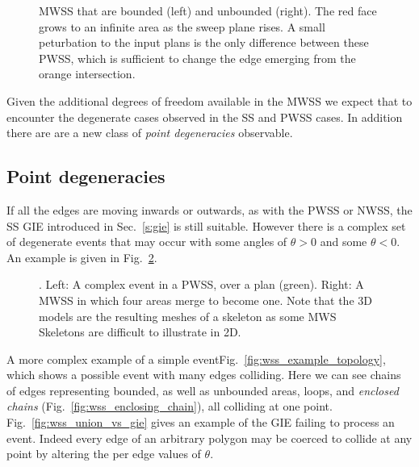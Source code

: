 \begin{figure}
  \centering
  \def\svgwidth{1.0\columnwidth}
  
  \caption[Unbounded MWSS]{\label{fig:wss_unbounded}MWSS that are bounded (left) and unbounded (right). The red face grows to an infinite area as the sweep plane rises. A small peturbation to the input plans is the only difference between these PWSS, which is sufficient to change the edge emerging from the orange intersection. }
\end{figure}

Given the additional degrees of freedom available in the MWSS we expect that to encounter the degenerate cases observed in the SS and PWSS cases. In addition there are are a new class of \emph{point degeneracies} observable.

\subsection{Point degeneracies}


If all the edges are moving inwards or outwards, as with the PWSS or NWSS, the SS GIE introduced in Sec.~\ref{s:gie} is still suitable. However there is a complex set of degenerate events that may occur with some angles of $\theta > 0$ and some $\theta < 0$. An example is given in Fig.~\ref{fig:wss_strange}.

\begin{figure}
  \centering
  \def\svgwidth{1.0\columnwidth}
  
  \caption[Degenerate events in the PWSS and MWSS]{\label{fig:wss_strange}. Left: A complex event in a PWSS, over a plan (green). Right: A MWSS in which four areas merge to become one. Note that the 3D models are the resulting meshes of a skeleton as some MWS Skeletons are difficult to illustrate in 2D. }
\end{figure}


A more complex example of a simple eventFig.~\ref{fig:wss_example_topology}, which shows a possible event with many edges colliding. Here we can see chains of edges representing bounded, as well as unbounded areas, loops, and \emph{enclosed chains} (Fig.~\ref{fig:wss_enclosing_chain}), all colliding at one point. Fig.~\ref{fig:wss_union_vs_gie} gives an example of the GIE failing to process an event. Indeed every edge of an arbitrary polygon may be coerced to collide at any point by altering the per edge values of $\theta$.

